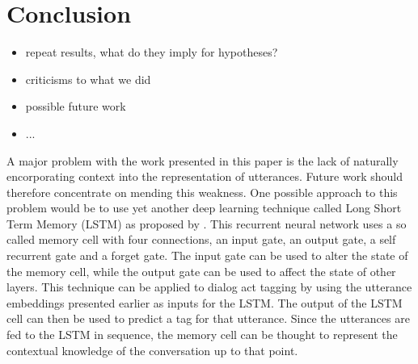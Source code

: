 \section{Conclusion}\label{sec:conclusion}
\begin{itemize}
	\item repeat results, what do they imply for hypotheses?
	\item criticisms to what we did
	\item possible future work
	\item ...
\end{itemize}

A major problem with the work presented in this paper is the lack of naturally encorporating context into the representation of utterances. Future work should therefore concentrate on mending this weakness. One possible approach to this problem would be to use yet another deep learning technique called Long Short Term Memory (LSTM) as proposed by . This recurrent neural network uses a so called memory cell with four connections, an input gate, an output gate, a self recurrent gate and a forget gate. The input gate can be used to alter the state of the memory cell, while the output gate can be used to affect the state of other layers. This technique can be applied to dialog act tagging by using the utterance embeddings presented earlier as inputs for the LSTM. The output of the LSTM cell can then be used to predict a tag for that utterance. Since the utterances are fed to the LSTM in sequence, the memory cell can be thought to represent the contextual knowledge of the conversation up to that point.